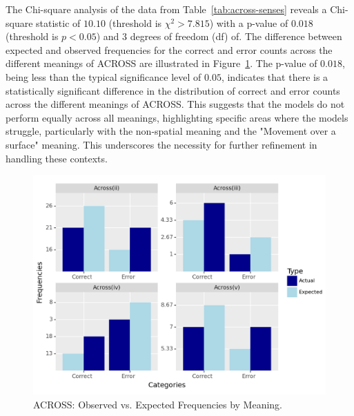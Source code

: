 The Chi-square analysis of the data from Table~\ref{tab:across-senses} reveals a Chi-square statistic of $10.10$  (threshold is $\chi^2 > 7.815$) with a p-value of $0.018$ (threshold is $p < 0.05$) and $3$ degrees of freedom (df) of. The difference between expected and observed frequencies for the correct and error counts across the different meanings of ACROSS are illustrated in Figure~\ref{fig:across-senses-chi}. The p-value of $0.018$, being less than the typical significance level of $0.05$, indicates that there is a statistically significant difference in the distribution of correct and error counts across the different meanings of ACROSS. This suggests that the models do not perform equally across all meanings, highlighting specific areas where the models struggle, particularly with the non-spatial meaning and the "Movement over a surface" meaning. This underscores the necessity for further refinement in handling these contexts.

\begin{figure}[htb]
        \centering
        \includegraphics[width=.8\textwidth]{textual/Figuras/Results/Unknown-70.png}
        \caption{ACROSS: Observed vs. Expected Frequencies by Meaning.}
        \label{fig:across-senses-chi}
\end{figure}


